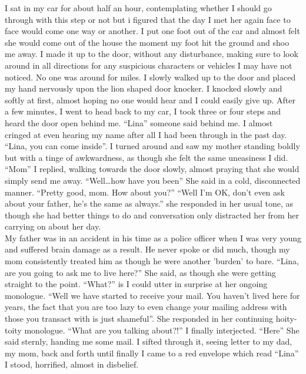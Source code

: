 \documentclass[a5paper]{scrartcl}
\begin{document}
I sat in my car for about half an hour, contemplating whether I should go through with this step or not but i figured that the day I met her again face to face would come one way or another. I put one foot out of the car and almost felt she would come out of the house the moment my foot hit the ground and shoo me away. I made it up to the door, without any disturbance, making sure to look around in all directions for any suspicious characters or vehicles I may have not noticed. No one was around for miles. I slowly walked up to the door and placed my hand nervously upon the lion shaped door knocker. I knocked slowly and softly at first, almost hoping no one would hear and I could easily give up. After a few minutes, I went to head back to my car, I took three or four steps and heard the door open behind me. \enquote{Lina} someone said behind me. I almost cringed at even hearing my name after all I had been through in the past day. \enquote{Lina, you can come inside}. I turned around and saw my mother standing boldly but with a tinge of awkwardness, as though she felt the same uneasiness I did. \enquote{Mom} I replied, walking towards the door slowly, almost praying that she would simply send me away. \enquote{Well\dots how have you been} She said in a cold, disconnected manner. \enquote{Pretty good, mom. How about you?} \enquote{Well I'm OK, don't even ask about your father, he's the same as always.} she responded in her usual tone, as though she had better things to do and conversation only distracted her from her carrying on about her day.\\


My father was in an accident in his time as a police officer when I was very young and suffered brain damage as a result. He never spoke or did much, though my mom consistently treated him as though he were another 'burden' to bare. \enquote{Lina, are you going to ask me to live here?} She said, as though she were getting straight to the point. \enquote{What?} is I could utter in surprise at her ongoing monologue. \enquote{Well we have started to receive your mail. You haven't lived here for years, the fact that you are too lazy to even change your mailing address with those you transact with is just shameful}. She responded in her continuing hoity-toity monologue. \enquote{What are you talking about?!} I finally interjected. \enquote{Here} She said sternly, handing me some mail. I sifted through it, seeing letter to my dad, my mom, back and forth until finally I came to a red envelope which read \enquote{Lina} I stood, horrified, almost in disbelief.\\
\end{document}
